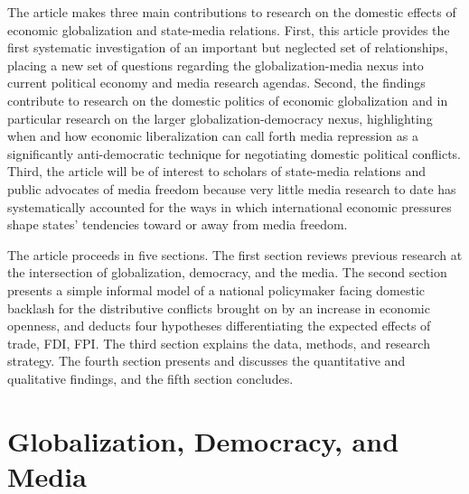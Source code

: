 \documentclass[12pt,a4paper]{article}\usepackage[]{graphicx}\usepackage[]{color}
\begin{document}
The article makes three main contributions to research on the domestic effects of economic globalization and state-media relations. First, this article provides the first systematic investigation of an important but neglected set of relationships, placing a new set of questions regarding the globalization-media nexus into current political economy and media research agendas. Second, the findings contribute to research on the domestic politics of economic globalization and in particular research on the larger globalization-democracy nexus, highlighting when and how economic liberalization can call forth media repression as a significantly anti-democratic technique for negotiating domestic political conflicts. Third, the article will be of interest to scholars of state-media relations and public advocates of media freedom because very little media research to date has systematically accounted for the ways in which international economic pressures shape states' tendencies toward or away from media freedom.

The article proceeds in five sections. The first section reviews previous research at the intersection of globalization, democracy, and the media. The second section presents a simple informal model of a national policymaker facing domestic backlash for the distributive conflicts brought on by an increase in economic openness, and deducts four hypotheses differentiating the expected effects of trade, FDI, FPI. The third section explains the data, methods, and research strategy. The fourth section presents and discusses the quantitative and qualitative findings, and the fifth section concludes.

\section{Globalization, Democracy, and Media}
\end{document}
